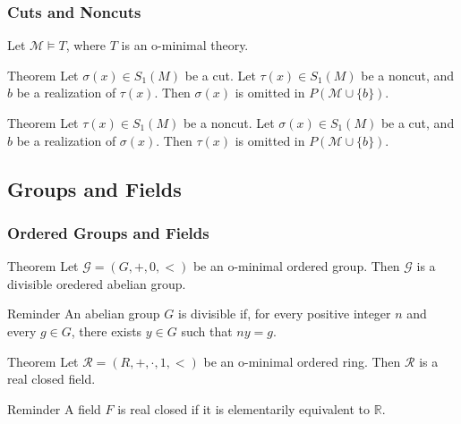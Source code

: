 \begin{frame}[c]\frametitle{Cuts and Noncuts}

	Let $\mathcal{M} \vDash T$, where $T$ is an o-minimal theory.
    \break
    \break
	\begin{beamerboxesrounded}[shadow=true]{Theorem \citep{marker1986omitting}}
		Let $\sigma (x) \in S_1 (M)$ be a cut. 
		Let $\tau (x) \in S_1 (M)$ be a noncut, and $b$ be a realization of $\tau (x)$.
		Then $\sigma (x)$ is omitted in $P(\mathcal{M} \cup \{b\})$.
	\end{beamerboxesrounded}

	\begin{beamerboxesrounded}[shadow=true]{Theorem \citep{marker1986omitting}}
		Let $\tau (x) \in S_1 (M)$ be a noncut. 
		Let $\sigma (x) \in S_1 (M)$ be a cut, and $b$ be a realization of $\sigma (x)$.
		Then $\tau (x)$ is omitted in $P(\mathcal{M} \cup \{b\})$.
	\end{beamerboxesrounded}

\end{frame}

\subsection{Groups and Fields}

\begin{frame}[t]\frametitle{Ordered Groups and Fields}
    
	\begin{beamerboxesrounded}[shadow=true]{Theorem \citep{pillay1986definable}}
		Let $\mathcal{G}=(G,+,0,<)$ be an o-minimal ordered group. 
		Then $\mathcal{G}$ is a divisible oredered abelian group.
	\end{beamerboxesrounded}

	\begin{beamerboxesrounded}[shadow=true]{Reminder}
		An abelian group $G$ is divisible if, for every positive integer $n$ and every $g \in G$, there exists $y \in G$ such that $ny = g$.
	\end{beamerboxesrounded}

	\begin{beamerboxesrounded}[shadow=true]{Theorem \citep{pillay1986definable}}
		Let $\mathcal{R}=(R,+,\cdot,1,<)$ be an o-minimal ordered ring. 
		Then $\mathcal{R}$ is a real closed field.
	\end{beamerboxesrounded}

	\begin{beamerboxesrounded}[shadow=true]{Reminder}
		A field $F$ is real closed if it is elementarily equivalent to $\mathbb{R}$.
	\end{beamerboxesrounded}

\end{frame}

